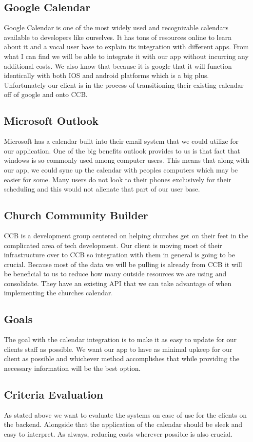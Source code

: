 \documentclass[letterpaper,10pt,draftclsnofoot,onecolumn,titlepage]{IEEEtran}
\begin{document}
	\subsection{Google Calendar}
	Google Calendar is one of the most widely used and recognizable calendars available to developers like ourselves. It has tons of resources online to learn about it and a vocal user base to explain its integration with different apps. From what I can find we will be able to integrate it with our app without incurring any additional costs. We also know that because it is google that it will function identically with both IOS and android platforms which is a big plus. Unfortunately our client is in the process of transitioning their existing calendar off of google and onto CCB.
	\subsection{Microsoft Outlook}
	Microsoft has a calendar built into their email system that we could utilize for our application. One of the big benefits outlook provides to us is that fact that windows is so commonly used among computer users. This means that along with our app, we could sync up the calendar with peoples computers which may be easier for some. Many users do not look to their phones exclusively for their scheduling and this would not alienate that part of our user base.
	\subsection{Church Community Builder}
	CCB is a development group centered on helping churches get on their feet in the complicated area of tech development. Our client is moving most of their infrastructure over to CCB so integration with them in general is going to be crucial. Because most of the data we will be pulling is already from CCB it will be beneficial to us to reduce how many outside resources we are using and consolidate. They have an existing API that we can take advantage of when implementing the churches calendar.
	\subsection{Goals}
	The goal with the calendar integration is to make it as easy to update for our clients staff as possible. We want our app to have as minimal upkeep for our client as possible and whichever method accomplishes that while providing the necessary information will be the best option.
	\subsection{Criteria Evaluation}
	As stated above we want to evaluate the systems on ease of use for the clients on the backend. Alongside that the application of the calendar should be sleek and easy to interpret. As always, reducing costs wherever possible is also crucial.
\end{document}

